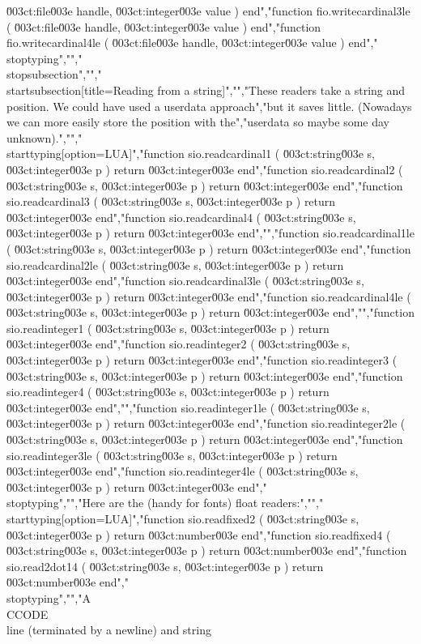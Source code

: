 \u003ct:file\u003e handle, \u003ct:integer\u003e value ) end","function fio.writecardinal3le ( \u003ct:file\u003e handle, \u003ct:integer\u003e value ) end","function fio.writecardinal4le ( \u003ct:file\u003e handle, \u003ct:integer\u003e value ) end","\\stoptyping","","\\stopsubsection","","\\startsubsection[title=Reading from a string]","","These readers take a string and position. We could have used a userdata approach","but it saves little. (Nowadays we can more easily store the position with the","userdata so maybe some day \\unknown).","","\\starttyping[option=LUA]","function sio.readcardinal1 ( \u003ct:string\u003e s, \u003ct:integer\u003e p ) return \u003ct:integer\u003e end","function sio.readcardinal2 ( \u003ct:string\u003e s, \u003ct:integer\u003e p ) return \u003ct:integer\u003e end","function sio.readcardinal3 ( \u003ct:string\u003e s, \u003ct:integer\u003e p ) return \u003ct:integer\u003e end","function sio.readcardinal4 ( \u003ct:string\u003e s, \u003ct:integer\u003e p ) return \u003ct:integer\u003e end","","function sio.readcardinal1le ( \u003ct:string\u003e s, \u003ct:integer\u003e p ) return \u003ct:integer\u003e end","function sio.readcardinal2le ( \u003ct:string\u003e s, \u003ct:integer\u003e p ) return \u003ct:integer\u003e end","function sio.readcardinal3le ( \u003ct:string\u003e s, \u003ct:integer\u003e p ) return \u003ct:integer\u003e end","function sio.readcardinal4le ( \u003ct:string\u003e s, \u003ct:integer\u003e p ) return \u003ct:integer\u003e end","","function sio.readinteger1 ( \u003ct:string\u003e s, \u003ct:integer\u003e p ) return \u003ct:integer\u003e end","function sio.readinteger2 ( \u003ct:string\u003e s, \u003ct:integer\u003e p ) return \u003ct:integer\u003e end","function sio.readinteger3 ( \u003ct:string\u003e s, \u003ct:integer\u003e p ) return \u003ct:integer\u003e end","function sio.readinteger4 ( \u003ct:string\u003e s, \u003ct:integer\u003e p ) return \u003ct:integer\u003e end","","function sio.readinteger1le ( \u003ct:string\u003e s, \u003ct:integer\u003e p ) return \u003ct:integer\u003e end","function sio.readinteger2le ( \u003ct:string\u003e s, \u003ct:integer\u003e p ) return \u003ct:integer\u003e end","function sio.readinteger3le ( \u003ct:string\u003e s, \u003ct:integer\u003e p ) return \u003ct:integer\u003e end","function sio.readinteger4le ( \u003ct:string\u003e s, \u003ct:integer\u003e p ) return \u003ct:integer\u003e end","\\stoptyping","","Here are the (handy for fonts) float readers:","","\\starttyping[option=LUA]","function sio.readfixed2 ( \u003ct:string\u003e s, \u003ct:integer\u003e p ) return \u003ct:number\u003e end","function sio.readfixed4 ( \u003ct:string\u003e s, \u003ct:integer\u003e p ) return \u003ct:number\u003e end","function sio.read2dot14 ( \u003ct:string\u003e s, \u003ct:integer\u003e p ) return \u003ct:number\u003e end","\\stoptyping","","A \\CCODE\\ line (terminated by a newline) and string 